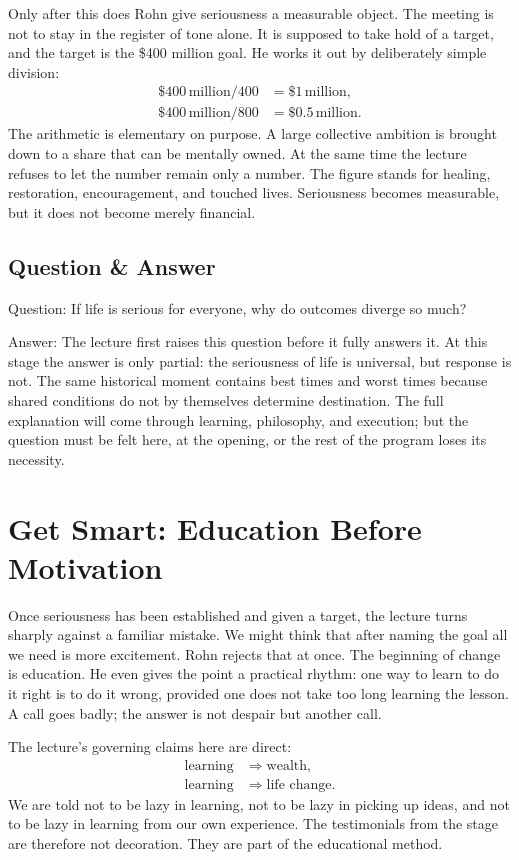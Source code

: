 Only after this does Rohn give seriousness a measurable object. The meeting is not to stay in the register of tone alone. It is supposed to take hold of a target, and the target is the \$400 million goal. He works it out by deliberately simple division:
\begin{align}
\$400\,\text{million}/400 &= \$1\,\text{million},\\
\$400\,\text{million}/800 &= \$0.5\,\text{million}.
\end{align}
The arithmetic is elementary on purpose. A large collective ambition is brought down to a share that can be mentally owned. At the same time the lecture refuses to let the number remain only a number. The figure stands for healing, restoration, encouragement, and touched lives. Seriousness becomes measurable, but it does not become merely financial.

\subsection{Question \& Answer}

Question: If life is serious for everyone, why do outcomes diverge so much?

Answer: The lecture first raises this question before it fully answers it. At this stage the answer is only partial: the seriousness of life is universal, but response is not. The same historical moment contains best times and worst times because shared conditions do not by themselves determine destination. The full explanation will come through learning, philosophy, and execution; but the question must be felt here, at the opening, or the rest of the program loses its necessity.

\section{Get Smart: Education Before Motivation}

Once seriousness has been established and given a target, the lecture turns sharply against a familiar mistake. We might think that after naming the goal all we need is more excitement. Rohn rejects that at once. The beginning of change is education. He even gives the point a practical rhythm: one way to learn to do it right is to do it wrong, provided one does not take too long learning the lesson. A call goes badly; the answer is not despair but another call.

The lecture's governing claims here are direct:
\begin{align}
\text{learning} &\Rightarrow \text{wealth},\\
\text{learning} &\Rightarrow \text{life change}.
\end{align}
We are told not to be lazy in learning, not to be lazy in picking up ideas, and not to be lazy in learning from our own experience. The testimonials from the stage are therefore not decoration. They are part of the educational method.

